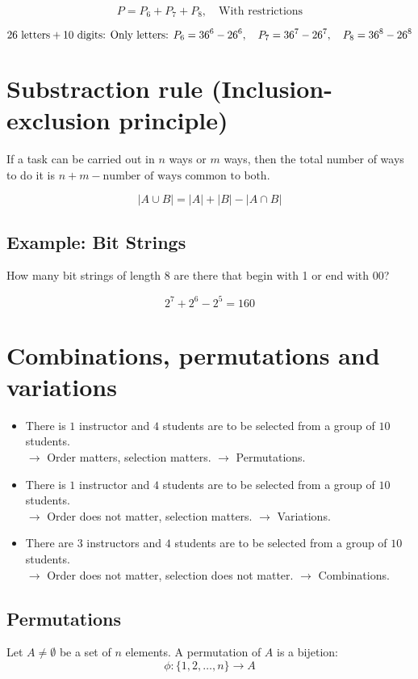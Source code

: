 \documentclass[11pt]{article}
\begin{document}
\[
P = P_6 + P_7 + P_8, \quad \text{With restrictions}
\]

\[
26 \text{ letters} + 10 \text{ digits: } \\
\text{Only letters: } P_6 = 36^6 - 26^6, \quad P_7 = 36^7 - 26^7, \quad P_8 = 36^8 - 26^8
\]

\section{Substraction rule (Inclusion-exclusion principle)}
If a task can be carried out in $n$ ways or $m$ ways, then the total number of ways to do it is $n + m - \text{number of ways common to both}$.

\[
|A \cup B| = |A| + |B| - |A \cap B|
\]

\subsection*{Example: Bit Strings}
How many bit strings of length 8 are there that begin with 1 or end with 00?

\[
2^7 + 2^6 - 2^5 = 160
\]

\section{Combinations, permutations and variations}
\begin{itemize}
    \item There is $1$ instructor and $4$ students are to be selected from a group of $10$ students. \\ 
    $\rightarrow$ Order matters, selection matters. $\rightarrow$ Permutations.
    
    \item There is $1$ instructor and $4$ students are to be selected from a group of $10$ students. \\ 
    $\rightarrow$ Order does not matter, selection matters. $\rightarrow$ Variations.
    
    \item There are $3$ instructors and $4$ students are to be selected from a group of $10$ students. \\ 
    $\rightarrow$ Order does not matter, selection does not matter. $\rightarrow$ Combinations.
\end{itemize}

\subsection{Permutations}
Let $A \neq \emptyset$ be a set of $n$ elements. A permutation of $A$ is a bijetion:
\[
\phi: \{1,2,\dots ,n\} \rightarrow A
\]
\end{document}
